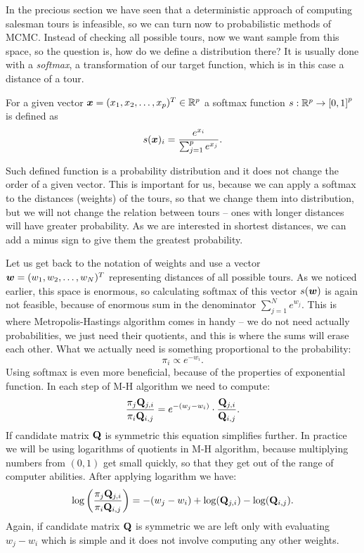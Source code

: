 In the precious section we have seen that a deterministic approach of computing salesman tours is infeasible, so we can turn now to probabilistic methods of MCMC. Instead of checking all possible tours, now we want sample from this space, so the question is, how do we define a distribution there? It is usually done with a \textit{softmax}, a transformation of our target function, which is in this case a distance of a tour.

\begin{definition}
	For a given vector $\bm{x} = (x_1, x_2, \ldots, x_p)^T \in \mathbb{R}^p$ a softmax function $s: \mathbb{R}^p \rightarrow \left[0, 1\right]^p$ is defined as
	\begin{equation*}
		s(\bm{x})_i = \frac{e^{x_i}}{\sum_{j=1}^{p} e^{x_j}}.
	\end{equation*}
\end{definition}
Such defined function is a probability distribution and it does not change the order of a given vector. This is important for us, because we can apply a softmax to the distances (weights) of the tours, so that we change them into distribution, but we will not change the relation between tours -- ones with longer distances will have greater probability. As we are interested in shortest distances, we can add a minus sign to give them the greatest probability.

Let us get back to the notation of weights and use a vector $\bm{w} = (w_1, w_2, \ldots, w_N)^T$ representing distances of all possible tours. As we noticed earlier, this space is enormous, so calculating softmax of this vector $s(\bm{w})$ is again not feasible, because of enormous sum in the denominator $\sum_{j=1}^{N} e^{w_j}$. This is where Metropolis-Hastings algorithm comes in handy -- we do not need actually probabilities, we just need their quotients, and this is where the sums will erase each other. What we actually need is something proportional to the probability:
\begin{equation*}
	\pi_i \propto e^{-w_i}.
\end{equation*}
Using softmax is even more beneficial, because of the properties of exponential function. In each step of M-H algorithm we need to compute:
\begin{equation*}
	\frac{\pi_j \mathbf{Q}_{j,i}}{\pi_i \mathbf{Q}_{i,j}} = e^{-(w_j-w_i)} \cdot \frac{\mathbf{Q}_{j,i}}{\mathbf{Q}_{i,j}}.
\end{equation*}
If candidate matrix $\mathbf{Q}$ is symmetric this equation simplifies further. In practice we will be using logarithms of quotients in M-H algorithm, because multiplying numbers from $(0,1)$ get small quickly, so that they get out of the range of computer abilities. After applying logarithm we have:
\begin{equation*}
	\log \left( \frac{\pi_j \mathbf{Q}_{j,i}}{\pi_i \mathbf{Q}_{i,j}} \right) = -(w_j-w_i) + \log(\mathbf{Q}_{j,i}) - \log(\mathbf{Q}_{i,j}).
\end{equation*}
Again, if candidate matrix $\mathbf{Q}$ is symmetric we are left only with evaluating $w_j-w_i$ which is simple and it does not involve computing any other weights.

